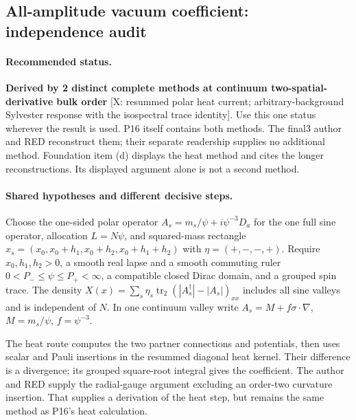 \subsection*{All-amplitude vacuum coefficient: independence audit}

\paragraph*{Recommended status.}
\textbf{Derived by 2 distinct complete methods at continuum
two-spatial-derivative bulk order}
[X: resummed polar heat current; arbitrary-background Sylvester response
with the isospectral trace identity].
Use this one status wherever the result is used.
P16 itself contains both methods.  The final3 author and RED reconstruct
them; their separate readership supplies no additional method.
Foundation item (d) displays the heat method and cites the longer
reconstructions.  Its displayed argument alone is not a second method.

\paragraph*{Shared hypotheses and different decisive steps.}
Choose the one-sided polar operator
$A_s=m_s/\psi+i\psi^{-3}D_a$ for the one full sine operator,
allocation $L=N\psi$, and squared-mass rectangle
$x_s=(x_0,x_0+h_1,x_0+h_2,x_0+h_1+h_2)$ with
$\eta=(+,-,-,+)$.
Require $x_0,h_1,h_2>0$, a smooth real lapse and a smooth commuting ruler
$0<P_-\leq\psi\leq P_+<\infty$, a compatible closed Dirac domain,
and a grouped spin trace.  The density
$X(x)=\sum_s\eta_s\operatorname{tr}_2
 (|A_s^\dagger|-|A_s|)_{xx}$ includes all sine valleys and is
independent of $N$.  In one continuum valley write
$A_s=M+f\sigma\cdot\nabla$, $M=m_s/\psi$, $f=\psi^{-3}$.

The heat route computes the two partner connections and potentials,
then uses scalar and Pauli insertions in the resummed diagonal heat
kernel.  Their difference is a divergence; its grouped square-root
integral gives the coefficient.  The author and RED supply the
radial-gauge argument excluding an order-two curvature insertion.
That supplies a derivation of the heat step, but remains the same
method as P16's heat calculation.

